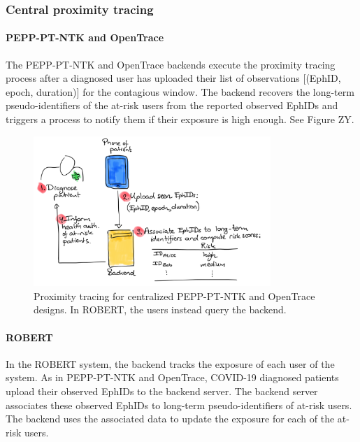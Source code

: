 \documentclass{article}
\begin{document}
\subsubsection{Central proximity
tracing}\label{central-proximity-tracing}

\paragraph{PEPP-PT-NTK and OpenTrace}\label{pepp-pt-ntk-and-opentrace}

The PEPP-PT-NTK and OpenTrace backends execute the proximity tracing
process after a diagnosed user has uploaded their list of observations
{[}(EphID, epoch, duration){]} for the contagious window. The backend
recovers the long-term pseudo-identifiers of the at-risk users from the
reported observed EphIDs and triggers a process to notify them if their
exposure is high enough. See Figure ZY.

\begin{figure}\centering
\includegraphics[width=0.8\textwidth]{figs/PT-central.png}
\caption{Proximity tracing for centralized PEPP-PT-NTK and OpenTrace designs. In ROBERT, the users instead query the backend.}
\end{figure}


\paragraph{ROBERT}\label{robert}

In the ROBERT system, the backend tracks the exposure of each user of
the system. As in PEPP-PT-NTK and OpenTrace, COVID-19 diagnosed patients
upload their observed EphIDs to the backend server. The backend server
associates these observed EphIDs to long-term pseudo-identifiers of
at-risk users. The backend uses the associated data to update the
exposure for each of the at-risk users.
\end{document}
